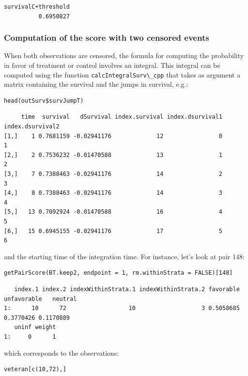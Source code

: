 \documentclass[12pt]{article}
\begin{document}
\begin{verbatim}
survivalC+threshold 
          0.6950827
\end{verbatim}

\subsubsection{Computation of the score with two censored events}
\label{sec:org1e8e79c}

When both observations are censored, the formula for computing the
probability in favor of treatment or control involves an
integral. This integral can be computed using the function
\texttt{calcIntegralSurv\textbackslash{}\_cpp} that takes as argument a matrix containing the
survival and the jumps in survival, e.g.:
\lstset{language=r,label= ,caption= ,captionpos=b,numbers=none}
\begin{lstlisting}
head(outSurv$survJumpT)
\end{lstlisting}

\begin{verbatim}
     time  survival   dSurvival index.survival index.dsurvival1 index.dsurvival2
[1,]    1 0.7681159 -0.02941176             12                0                1
[2,]    2 0.7536232 -0.01470588             13                1                2
[3,]    7 0.7388463 -0.02941176             14                2                3
[4,]    8 0.7388463 -0.02941176             14                3                4
[5,]   13 0.7092924 -0.01470588             16                4                5
[6,]   15 0.6945155 -0.02941176             17                5                6
\end{verbatim}


and the starting time of the integration time. For instance, let's
look at pair 148:
\lstset{language=r,label= ,caption= ,captionpos=b,numbers=none}
\begin{lstlisting}
getPairScore(BT.keep2, endpoint = 1, rm.withinStrata = FALSE)[148]
\end{lstlisting}

\begin{verbatim}
   index.1 index.2 indexWithinStrata.1 indexWithinStrata.2 favorable unfavorable   neutral
1:      10      72                  10                   3 0.5058685   0.3770426 0.1170889
   uninf weight
1:     0      1
\end{verbatim}


which corresponds to the observations:
\lstset{language=r,label= ,caption= ,captionpos=b,numbers=none}
\begin{lstlisting}
veteran[c(10,72),]
\end{lstlisting}
\end{document}
